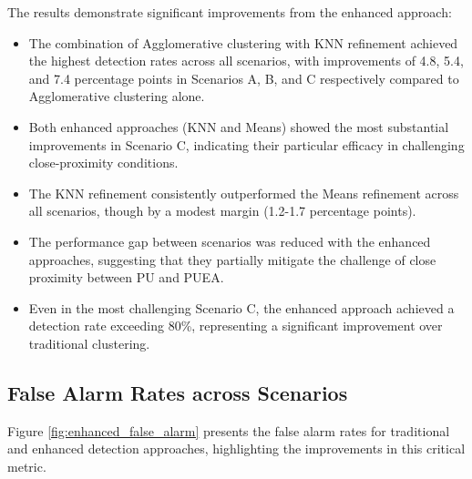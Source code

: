 The results demonstrate significant improvements from the enhanced approach:

\begin{itemize}
    \item The combination of Agglomerative clustering with KNN refinement achieved the highest detection rates across all scenarios, with improvements of 4.8, 5.4, and 7.4 percentage points in Scenarios A, B, and C respectively compared to Agglomerative clustering alone.
    
    \item Both enhanced approaches (KNN and Means) showed the most substantial improvements in Scenario C, indicating their particular efficacy in challenging close-proximity conditions.
    
    \item The KNN refinement consistently outperformed the Means refinement across all scenarios, though by a modest margin (1.2-1.7 percentage points).
    
    \item The performance gap between scenarios was reduced with the enhanced approaches, suggesting that they partially mitigate the challenge of close proximity between PU and PUEA.
    
    \item Even in the most challenging Scenario C, the enhanced approach achieved a detection rate exceeding 80\%, representing a significant improvement over traditional clustering.
\end{itemize}

\subsection{False Alarm Rates across Scenarios}

Figure \ref{fig:enhanced_false_alarm} presents the false alarm rates for traditional and enhanced detection approaches, highlighting the improvements in this critical metric.

